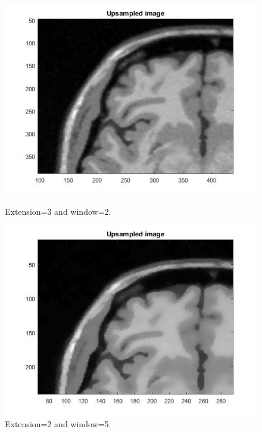 \begin{itemize}
\begin{figure}[H]
\centering
\begin{minipage}{.5\textwidth}
  \centering
  \includegraphics[width=.7\linewidth]{figures/Module_10/Module10_6_b}
 \caption{Extension=3 and window=2.}
  \label{fig: Module10_66_b}
\end{minipage}%
\begin{minipage}{.5\textwidth}
  \centering
  \includegraphics[width=.7\linewidth]{figures/Module_10/Module10_7_b}
 \caption{Extension=2 and window=5.}
  \label{fig: Module10_77_b}
\end{minipage}


\end{figure}
\end{itemize}
